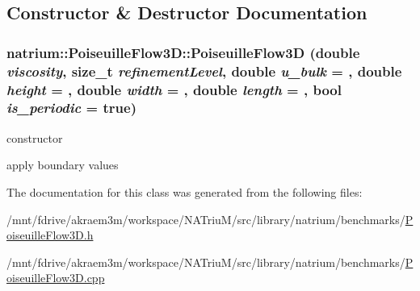 \subsection{Constructor \& Destructor Documentation}
\hypertarget{classnatrium_1_1PoiseuilleFlow3D_a65444fdaec3bb59ab98870acfcb297f1}{
\subsubsection[{PoiseuilleFlow3D}]{\setlength{\rightskip}{0pt plus 5cm}natrium::PoiseuilleFlow3D::PoiseuilleFlow3D (double {\em viscosity}, \/  size\_\-t {\em refinementLevel}, \/  double {\em u\_\-bulk} = {}, \/  double {\em height} = {}, \/  double {\em width} = {}, \/  double {\em length} = {}, \/  bool {\em is\_\-periodic} = {\ttfamily true})}}
\label{classnatrium_1_1PoiseuilleFlow3D_a65444fdaec3bb59ab98870acfcb297f1}


constructor 

apply boundary values 

The documentation for this class was generated from the following files:\begin{DoxyCompactItemize}
\item 
/mnt/fdrive/akraem3m/workspace/NATriuM/src/library/natrium/benchmarks/\hyperlink{PoiseuilleFlow3D_8h}{PoiseuilleFlow3D.h}\item 
/mnt/fdrive/akraem3m/workspace/NATriuM/src/library/natrium/benchmarks/\hyperlink{PoiseuilleFlow3D_8cpp}{PoiseuilleFlow3D.cpp}\end{DoxyCompactItemize}
